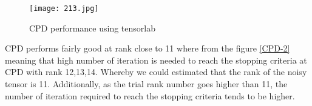 \begin{figure}[!htbp]
\centering
\texttt{[image: 213.jpg]}
\caption{CPD performance using tensorlab}
\end{figure}


 CPD performs fairly good at rank close to 11 where from the figure \ref{CPD-2} meaning that high number of iteration is needed to reach the stopping criteria at CPD with rank 12,13,14. Whereby we could estimated that the rank of the noisy tensor is 11. Additionally, as the trial rank number goes higher than 11, the number of iteration required to reach the stopping criteria tends to be higher. 
